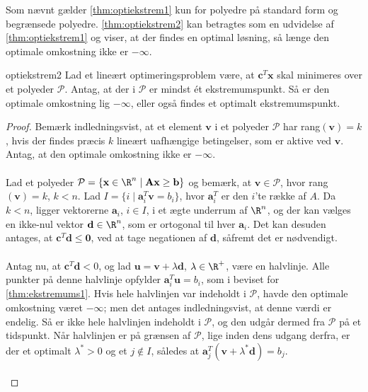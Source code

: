 %
%
%
Som nævnt gælder \ref{thm:optiekstrem1} kun for polyedre på standard form og begrænsede polyedre. 
\ref{thm:optiekstrem2} kan betragtes som en udvidelse af \ref{thm:optiekstrem1} og viser, at der findes en optimal løsning, så længe den optimale omkostning ikke er $-\infty$. 
%
\begin{thm}{}{optiekstrem2}
Lad et lineært optimeringsproblem være, at $\textbf{c}^T \textbf{x}$ skal minimeres over et polyeder $\mathcal{P}$. 
Antag, at der i $\mathcal{P}$ er mindst ét ekstremumspunkt. 
Så er den optimale omkostning lig $- \infty$, eller også findes et optimalt ekstremumspunkt. 
\end{thm}
%
\begin{proof}
Bemærk indledningsvist, at et element $\textbf{v}$ i et polyeder $\mathcal{P}$ har rang$(\textbf{v})=k$, hvis der findes præcis $k$ lineært uafhængige betingelser, som er aktive ved $\textbf{v}$. 
Antag, at den optimale omkostning ikke er $-\infty$. 
\\\\
%
Lad et polyeder $\mathcal{P} = \{\textbf{x} \in \R^n \mid \textbf{A}\textbf{x} \geq \textbf{b} \}$ og bemærk, at $\textbf{v} \in \mathcal{P}$, hvor rang$(\textbf{v})=k$, $k < n$. 
Lad $I = \{ i \mid \textbf{a}^T_i \textbf{v} = b_i \}$, hvor $\textbf{a}^T_i$ er den $i$'te række af $A$. 
Da $k < n$, ligger vektorerne $\textbf{a}_i$, $i \in I$, i et ægte underrum af $ \R^n$, og der kan vælges en ikke-nul vektor $\textbf{d} \in \R^n$, som er ortogonal til hver $\textbf{a}_i$. 
Det kan desuden antages, at $\textbf{c}^T \textbf{d} \leq \textbf{0}$, ved at tage negationen af $\textbf{d}$, såfremt det er nødvendigt. 
\\\\
%
Antag nu, at $\textbf{c}^T \textbf{d} < 0$, og lad $\textbf{u} = \textbf{v} + \lambda \textbf{d}$, $ \lambda \in \R^+$, være en halvlinje. 
Alle punkter på denne halvlinje opfylder $\textbf{a}^T_i \textbf{u} = b_i$, som i beviset for \ref{thm:ekstremums1}. 
Hvis hele halvlinjen var indeholdt i $\mathcal{P}$, havde den optimale omkostning været $- \infty $; men det antages indledningsvist, at denne værdi er endelig. 
Så er ikke hele halvlinjen indeholdt i $\mathcal{P}$, og den udgår dermed fra $\mathcal{P}$ på et tidspunkt. 
Når halvlinjen er på grænsen af $\mathcal{P}$, lige inden dens udgang derfra, er der et optimalt $ \lambda^* > 0$ og et $j \notin I$, således at $\textbf{a}^T_j (\textbf{v} + \lambda^* \textbf{d} ) = b_j $.
\\\\%

\end{proof}

